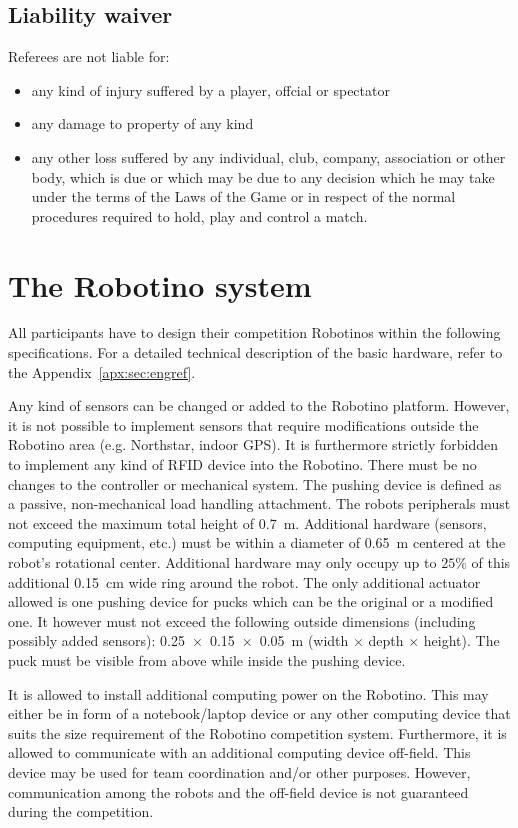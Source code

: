 \documentclass[12pt,twoside]{article}
\newcommand{\Robotino}{Robotino}
\begin{document}
\subsection{Liability waiver}
Referees are not liable for:
\begin{itemize}
\item any kind of injury suffered by a player, offcial or spectator
\item any damage to property of any kind
\item any other loss suffered by any individual, club, company, association or other body, which is due or which may be due to any decision which he may take under the terms of the Laws of the Game or in respect of the normal procedures required to hold, play and control a match.
\end{itemize}

\section{The Robotino system} \label{sec:robotino}

All participants have to design their competition Robotinos within the
following specifications. For a detailed technical description of the
basic hardware, refer to the Appendix~\ref{apx:sec:engref}.

Any kind of sensors can be changed or added to the Robotino platform.
However, it is not possible to implement sensors that require
modifications outside the Robotino area (e.g. Northstar, indoor GPS).
It is furthermore strictly forbidden to implement any kind of RFID
device into the Robotino. There must be no changes to the controller
or mechanical system. The pushing device is defined as a passive,
non-mechanical load handling attachment. The robots peripherals must
not exceed the maximum total height of \SI{0.7}{\metre}. Additional
hardware (sensors, computing equipment, etc.) must be within a
diameter of \SI{0.65}{\metre} centered at the robot's rotational
center. Additional hardware may only occupy up to $25\%$ of this
additional \SI{0.15}{\centi\metre} wide ring around the robot.  The
only additional actuator allowed is one pushing device for pucks which
can be the original or a modified one. It however must not exceed the
following outside dimensions (including possibly added sensors):
\SI{0.25 x 0.15 x 0.05}{\metre} (width $\times$ depth $\times$
height). The puck must be visible from above while inside the pushing
device.

It is allowed to install additional computing power on the
\Robotino. This may either be in form of a notebook/laptop device or
any other computing device that suits the size requirement of the
\Robotino{} competition system. Furthermore, it is allowed to
communicate with an additional computing device off-field. This device
may be used for team coordination and/or other purposes. However,
communication among the robots and the off-field device is not
guaranteed during the competition.
\end{document}
